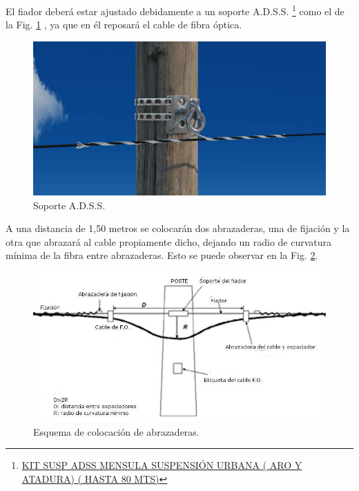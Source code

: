\documentclass[11pt,a4paper]{article}
\begin{document}
El fiador deberá estar ajustado debidamente a un soporte A.D.S.S. \footnote{\href{https://www.preform.com.ar/tienda/telecomunicaciones/redes-de-fibra-adss/suspenciones/kit-retencion-adss-prolongador-grillete-y-preformado-120-mts/}{KIT SUSP ADSS MENSULA SUSPENSIÓN URBANA ( ARO Y ATADURA) ( HASTA 80 MTS)}} como el de la Fig. \ref{fig:soporte_adss} , ya que en él reposará el cable de fibra óptica. 

\begin{figure}[htbp]
  \centering
  \includegraphics[width=0.7\linewidth]{fotos_ema/soporte_adss.jpg}
  \caption{Soporte A.D.S.S.}
  \label{fig:soporte_adss}
\end{figure}


A una distancia de 1,50 metros se colocarán dos abrazaderas, una de fijación y la otra que abrazará al cable propiamente dicho, dejando un radio de curvatura mínima de la fibra entre abrazaderas. Esto se puede observar en la Fig. \ref{fig:esq_col_abrazadera}.


\begin{figure}[htbp]
  \centering
  \includegraphics[width=0.7\linewidth]{fotos_ema/esq_col_abrazadera.jpg}
  \caption{Esquema de colocación de abrazaderas.}
  \label{fig:esq_col_abrazadera}
\end{figure}



\end{document}
